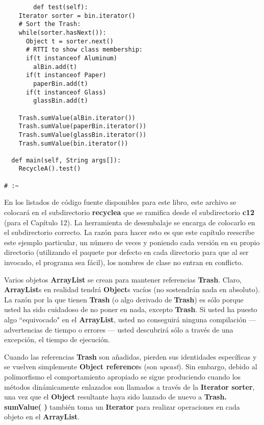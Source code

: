 \begin{lstlisting}
        def test(self): 
    Iterator sorter = bin.iterator() 
    # Sort the Trash: 
    while(sorter.hasNext()): 
      Object t = sorter.next() 
      # RTTI to show class membership: 
      if(t instanceof Aluminum) 
        alBin.add(t) 
      if(t instanceof Paper) 
        paperBin.add(t) 
      if(t instanceof Glass) 
        glassBin.add(t)   
        
    Trash.sumValue(alBin.iterator()) 
    Trash.sumValue(paperBin.iterator()) 
    Trash.sumValue(glassBin.iterator()) 
    Trash.sumValue(bin.iterator()) 
    
  def main(self, String args[]): 
    RecycleA().test() 
    
# :~ 
\end{lstlisting}

En los listados de código fuente disponibles para este libro, este archivo se colocará en el subdirectorio \textbf{recyclea} que se ramifica desde el subdirectorio \textbf{c12} (para el Capítulo 12). La herramienta de desembalaje se encarga de colocarlo en el subdirectorio correcto. La razón para hacer esto es que este capítulo reescribe este ejemplo particular, un número de veces y poniendo cada versión en su propio directorio (utilizando el paquete por defecto en cada directorio para que al ser invocado, el programa sea fácil), los nombres de clase no entran en conflicto.     \newline

Varios objetos \textbf{ArrayList} se crean para mantener referencias \textbf{Trash}. Claro, \textbf{ArrayList}s en realidad tendrá \textbf{Object}s vacíos (no sostendrán nada en absoluto). La razón por la que tienen \textbf{Trash} (o algo derivado de \textbf{Trash}) es sólo porque usted ha sido cuidadoso de no poner en nada, excepto \textbf{Trash}. Si usted ha puesto algo “equivocado" en el \textbf{ArrayList}, usted no conseguirá ninguna compilación — advertencias de tiempo o errores — usted descubrirá sólo a través de una excepción, el tiempo de ejecución.   \newline

Cuando las referencias \textbf{Trash} son añadidas, pierden sus identidades específicas y se vuelven simplemente \textbf{Object reference}s (son \textit{upcast}). Sin embargo, debido al polimorfismo el comportamiento apropiado se sigue produciendo cuando los métodos dinámicamente enlazados son llamados a través de la \textbf{Iterator sorter}, una vez que el \textbf{Object} resultante haya sido lanzado de nuevo a \textbf{Trash. sumValue( )} también toma un \textbf{Iterator} para realizar operaciones en cada objeto en el \textbf{ArrayList}.   \newline

